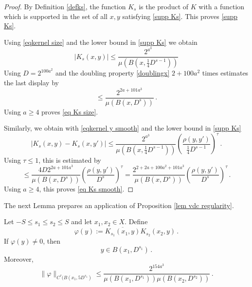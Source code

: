 \begin{proof}
By Definition \eqref{defks}, the function $K_s$ is the product of
$K$ with a function which is supported in the set of all
$x,y$ satisfying \eqref{supp Ks}. This proves \eqref{supp Ks}.

Using \eqref{eqkernel size} and the lower bound in \eqref{supp Ks}
we obtain
\begin{equation}
|K_s(x,y)|\le \frac{2^{a^3}}{\mu(B(x,\frac 14 D^{s-1}))}
\end{equation}
Using $D=2^{100a^2}$
and the doubling property \eqref{doublingx} $2 +100a^2$ times estimates
the last display by
\begin{equation}
\le \frac{2^{2a+101a^3}}{\mu(B(x,  D^{s}))}\, .
\end{equation}
Using $a\ge 4$ proves \eqref{eq Ks size}.


Similarly, we obtain with  \eqref{eqkernel y smooth} and the lower bound in
\eqref{supp Ks}
\begin{equation}
    |K_s(x,y)-K_s(x, y')|\le \frac{2^{a^3}}{\mu(B(x, \frac 14 D^{s-1}))}
    \left(\frac{ \rho(y,y')}{\frac 14 D^{s-1}}\right)^{\tau}\,.
\end{equation}
Using $\tau\le 1$, this is estimated by
\begin{equation}
   \le \frac{4D 2^{2a+101a^3}}{\mu(B(x,  D^{s}))}
    \left(\frac{ \rho(y,y')}{D^{s}}\right)^{\tau}
     = \frac{2^{2+2a+100a^2+101a^3}}{\mu(B(x,  D^{s}))}
    \left(\frac{ \rho(y,y')}{D^{s}}\right)^{\tau}\,.
\end{equation}
Using $a\ge 4$, this proves  \eqref{eq Ks smooth}.
\end{proof}
The next Lemma prepares an application of
Proposition \ref{lem vdc regularity}.
\begin{lemma}\label{lem ksquare}
Let $-S\le s_1\le s_2\le S$ and let $x_1,x_2\in X$.
Define \begin{equation}
 \varphi(y) :=  \overline{K_{s_1}(x_1, y)}
 K_{s_2}(x_2, y) \, .
\end{equation}
If $\varphi(y)\neq 0$, then
\begin{equation}\label{eqt10}
    y\in B(x_1, D^{s_1})\, .
\end{equation}
Moreover,
\begin{equation}\label{eqt11}
  \|\varphi\|_{C^\tau(B(x_1, 5D^{s_1})}\le
\frac{2^{154 a^3}}{\mu(B(x_1, D^{s_1}))\mu(B(x_2, D^{s_2}))}
      \, .
\end{equation}

\end{lemma}
